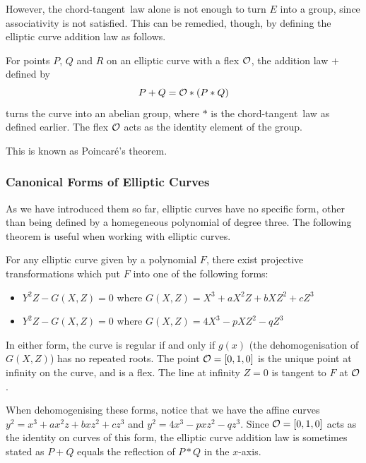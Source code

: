 However, the chord-tangent~law alone is not enough to turn $E$ into a group, since associativity is not satisfied.
This can be remedied, though, by defining the elliptic curve addition law as follows.
\begin{theorem}
	For points $P$, $Q$ and $R$ on an elliptic curve with a flex $\mathcal{O}$, the addition law $+$ defined by
	$$P + Q = \mathcal{O} * (P * Q)$$
	turns the curve into an abelian group, where $*$ is the chord-tangent~law as defined earlier.
	The flex $\mathcal{O}$ acts as the identity element of the group.
\end{theorem}
This is known as Poincaré's theorem.
\subsubsection{Canonical Forms of Elliptic Curves}
As we have introduced them so far, elliptic curves have no specific form, other than being defined by a homegeneous polynomial of degree three.
The following theorem is useful when working with elliptic curves.
\begin{theorem}
	For any elliptic curve given by a polynomial $F$, there exist projective transformations which put $F$ into one of the following forms:
	\begin{itemize}
		\item $Y^2Z - G(X,Z) = 0$ where $G(X,Z) = X^3 + aX^2Z + bXZ^2 + cZ^3$
		\item $Y^2Z - G(X,Z) = 0$ where $G(X,Z) = 4X^3 - pXZ^2 - qZ^3$
	\end{itemize}
	In either form, the curve is regular if and only if $g(x)$ (the dehomogenisation of $G(X,Z)$) has no repeated roots.
	The point $\mathcal{O} = [0,1,0]$ is the unique point at infinity on the curve, and is a flex.
	The line at infinity $Z = 0$ is tangent to $F$ at $\mathcal{O}$.
\end{theorem}
When dehomogenising these forms, notice that we have the affine curves $y^2 = x^3 + ax^2z + bxz^2 + cz^3$ and $y^2 = 4x^3 - pxz^2 - qz^3$.
Since $\mathcal{O} = [0,1,0]$ acts as the identity on curves of this form, the elliptic curve addition law is sometimes stated as $P + Q$ equals the reflection of $P * Q$ in the $x$-axis.
